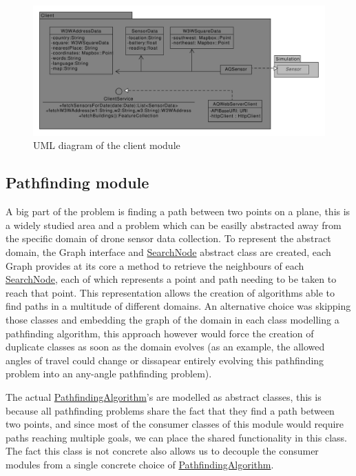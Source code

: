 \documentclass[10pt,a4paper]{article}
\begin{document}
\begin{figure}[h]
    \centering
    \includegraphics[width=0.8\columnwidth]{diagrams/client.uxf.pdf}
    \caption{UML diagram of the client module}
    \label{fig:client}
\end{figure}

\subsection{Pathfinding module}
A big part of the problem is finding a path between two points on a plane, this is a widely studied area and a problem which can be easilly abstracted away from the specific domain of drone sensor data collection.
To represent the abstract domain, the Graph interface and \hyperref[tab:SearchNode]{\color{blue}SearchNode} abstract class are created, each Graph provides at its core a method to retrieve the neighbours of each \hyperref[tab:SearchNode]{\color{blue}SearchNode}, each of which represents a point and path needing to be taken to reach that point.
This representation allows the creation of algorithms able to find paths in a multitude of different domains. An alternative choice was skipping those classes and embedding the graph of the domain in each class modelling a pathfinding algorithm, 
this approach however would force the creation of duplicate classes as soon as the domain evolves (as an example, the allowed angles of travel could change or dissapear entirely evolving this pathfinding problem into an any-angle pathfinding problem).
\par 
The actual \hyperref[tab:PathfindingAlgorithm]{\color{blue}PathfindingAlgorithm}'s are modelled as abstract classes, this is because all pathfinding problems share the fact that they find a path between two points, and since most of the consumer classes of this module would require paths reaching multiple goals, we can place the shared functionality in this class.
The fact this class is not concrete also allows us to decouple the consumer modules from a single concrete choice of \hyperref[tab:PathfindingAlgorithm]{\color{blue}PathfindingAlgorithm}.
\end{document}

